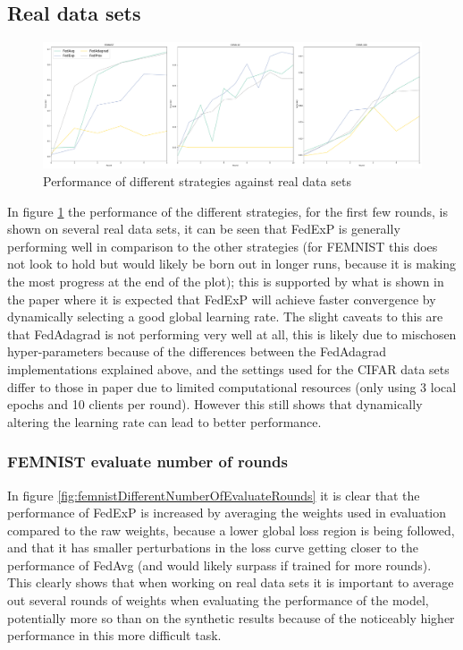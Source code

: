 \documentclass{article}
\begin{document}
\subsection{Real data sets}

\begin{figure}
    \centerline{\includegraphics[width=\linewidth]{figs/realDatasetPerformance.pdf}}
    \caption{Performance of different strategies against real data sets}
    \label{fig:realDatasetPerformance}
\end{figure}

In figure \ref{fig:realDatasetPerformance} the performance of the different strategies, for the first few rounds, is shown on several real data sets, it can be seen that FedExP is generally performing well in comparison to the other strategies (for FEMNIST this does not look to hold but would likely be born out in longer runs, because it is making the most progress at the end of the plot); this is supported by what is shown in the paper where it is expected that FedExP will achieve faster convergence by dynamically selecting a good global learning rate.  The slight caveats to this are that FedAdagrad is not performing very well at all, this is likely due to mischosen hyper-parameters because of the differences between the FedAdagrad implementations explained above, and the settings used for the CIFAR data sets differ to those in paper due to limited computational resources (only using 3 local epochs and 10 clients per round).  However this still shows that dynamically altering the learning rate can lead to better performance.

\subsubsection{FEMNIST evaluate number of rounds}

In figure \ref{fig:femnistDifferentNumberOfEvaluateRounds} it is clear that the performance of FedExP is increased by averaging the weights used in evaluation compared to the raw weights, because a lower global loss region is being followed, and that it has smaller perturbations in the loss curve getting closer to the performance of FedAvg (and would likely surpass if trained for more rounds).  This clearly shows that when working on real data sets it is important to average out several rounds of weights when evaluating the performance of the model, potentially more so than on the synthetic results because of the noticeably higher performance in this more difficult task.
\end{document}

